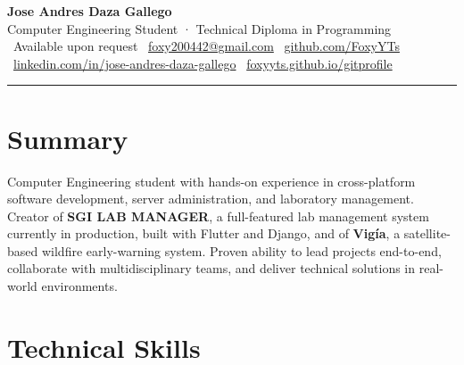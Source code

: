 \documentclass[11pt, a4paper]{article}
\begin{document}
\begin{center}
  {\Huge\bfseries\color{primary} Jose Andres Daza Gallego}\\[4pt]
  {\large\color{accent} Computer Engineering Student · Technical Diploma in Programming}\\[8pt]
  \small
  \faPhone\ Available upon request \quad
  \faEnvelope\ \href{mailto:foxy200442@gmail.com}{foxy200442@gmail.com} \quad
  \faGithub\ \href{https://github.com/FoxyYTs}{github.com/FoxyYTs}\\[3pt]
  \faLinkedin\ \href{https://www.linkedin.com/in/jose-andres-daza-gallego/}{linkedin.com/in/jose-andres-daza-gallego} \quad
  \faGlobe\ \href{https://foxyyts.github.io/gitprofile/}{foxyyts.github.io/gitprofile}
\end{center}

\vspace{2pt}
{\color{rulecol}\rule{\textwidth}{1.5pt}}
\vspace{2pt}

\section{Summary}

Computer Engineering student with hands-on experience in cross-platform software
development, server administration, and laboratory management. Creator of
\textbf{SGI LAB MANAGER}, a full-featured lab management system currently in production,
built with Flutter and Django, and of \textbf{Vigía}, a satellite-based wildfire
early-warning system. Proven ability to lead projects end-to-end, collaborate
with multidisciplinary teams, and deliver technical solutions in real-world environments.

\section{Technical Skills}
\end{document}
